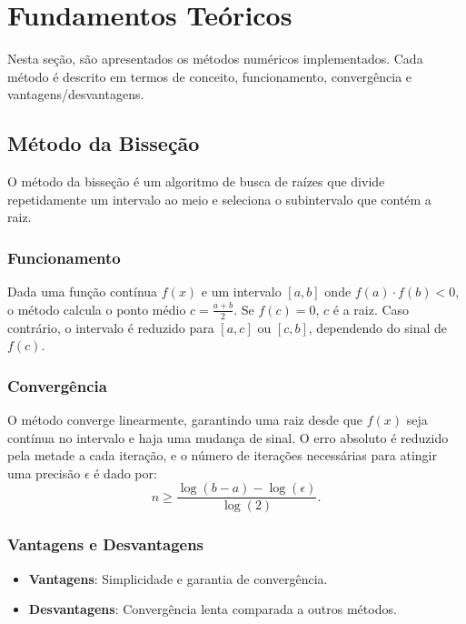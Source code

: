\section{Fundamentos Teóricos}

Nesta seção, são apresentados os métodos numéricos implementados. Cada método é
descrito em termos de conceito, funcionamento, convergência e
vantagens/desvantagens.\cite{ruggiero1996calculo}~\cite{asano2009calculo}

\subsection{\textbf{Método da Bisseção}}

O método da bisseção é um algoritmo de busca de raízes que divide repetidamente
um intervalo ao meio e seleciona o subintervalo que contém a
raiz.\cite{bartle1983elementos}~\cite{moreira2011curso}

\subsubsection{Funcionamento}

Dada uma função contínua \( f(x) \) e um intervalo \([a, b]\) onde \( f(a) \cdot
f(b) < 0 \), o método calcula o ponto médio \( c = \frac{a + b}{2} \). Se \(
f(c) = 0 \), \( c \) é a raiz. Caso contrário, o intervalo é reduzido para \([a,
		c]\) ou \([c, b]\), dependendo do sinal de \( f(c) \).

\subsubsection{Convergência}

O método converge linearmente, garantindo uma raiz desde que \( f(x) \) seja
contínua no intervalo e haja uma mudança de sinal. O erro absoluto é reduzido
pela metade a cada iteração, e o número de iterações necessárias para atingir
uma precisão \( \epsilon \) é dado por:
\[
	n \geq \frac{\log(b - a) - \log(\epsilon)}{\log(2)}.
\]

\subsubsection{Vantagens e Desvantagens}

\begin{itemize}
	\item \textbf{Vantagens}: Simplicidade e garantia de convergência.
	\item \textbf{Desvantagens}: Convergência lenta comparada a outros métodos.
\end{itemize}

